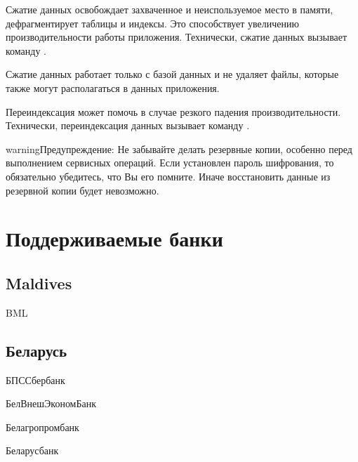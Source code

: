 \documentclass[a4paper,10pt,russian]{sphinxmanual}
\begin{document}
\noindent{}

\noindent{}

\sphinxAtStartPar
Сжатие данных освобождает захваченное и неиспользуемое место в памяти, дефрагментирует таблицы и индексы.
Это способствует увеличению производительности работы приложения. Технически, сжатие данных вызывает команду .

\sphinxAtStartPar
Сжатие данных работает только с базой данных и не удаляет файлы, которые также могут располагаться в данных приложения.

\sphinxAtStartPar
Переиндексация может помочь в случае резкого падения производительности. Технически, переиндексация данных вызывает
команду .

\begin{sphinxadmonition}{warning}{Предупреждение:}
\sphinxAtStartPar
Не забывайте делать резервные копии, особенно перед выполнением сервисных операций. Если установлен пароль шифрования, то обязательно убедитесь, что Вы его помните. Иначе восстановить данные из резервной копии будет невозможно.
\end{sphinxadmonition}

\sphinxstepscope


\chapter{Поддерживаемые банки}
\label{\detokenize{banks:chapter-supported-banks}}\label{\detokenize{banks:id1}}\label{\detokenize{banks::doc}}

\section{Maldives}
\label{\detokenize{banks:maldives}}
\sphinxAtStartPar
BML


\section{Беларусь}
\label{\detokenize{banks:id2}}
\sphinxAtStartPar
БПС\sphinxhyphen{}Сбербанк

\sphinxAtStartPar
БелВнешЭкономБанк

\sphinxAtStartPar
Белагропромбанк

\sphinxAtStartPar
Беларусбанк
\end{document}
